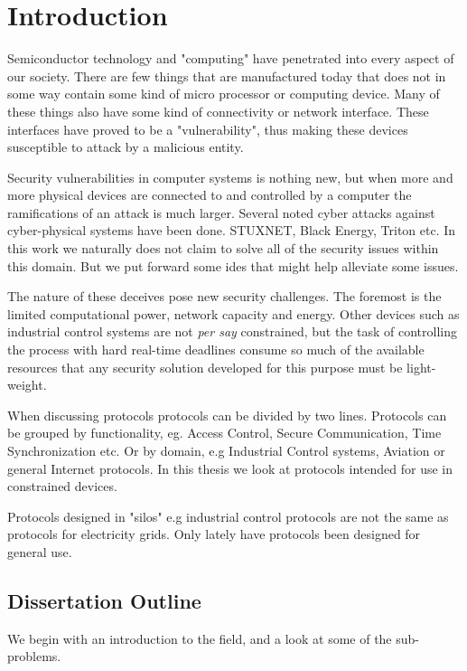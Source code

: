 \chapter{Introduction}
Semiconductor technology and "computing" have penetrated into every aspect of our society. There are few things that are manufactured today that does not in some way contain some kind of micro processor or computing device. Many of these things also have some kind of connectivity or network interface. These interfaces have proved to be a "vulnerability", thus making these devices susceptible to attack by a malicious entity.

Security vulnerabilities in computer systems is nothing new, but when more and more physical devices are connected to and controlled by a computer the ramifications of an attack is much larger.
Several noted cyber attacks against cyber-physical systems have been done. STUXNET, Black Energy, Triton etc.
In this work we naturally does not claim to solve all of the security issues within this domain. But we put forward some ides that might help alleviate some issues.

The nature of these deceives pose new security challenges. The foremost is the limited computational power, network capacity and energy. 
Other devices such as industrial control systems are not \emph{per say} constrained, but the task of controlling the process with hard real-time deadlines consume so much of the available resources that any security solution developed for this purpose must be light-weight. 

When discussing protocols protocols can be divided by two lines. Protocols can be grouped by functionality, eg. Access Control, Secure Communication, Time Synchronization etc. Or by domain, e.g Industrial Control systems, Aviation or general Internet protocols. 
In this thesis we look at protocols intended for use in constrained devices. 

Protocols designed in "silos" e.g industrial control protocols are not the same as protocols for electricity grids. 
Only lately have protocols been designed for general use. 



\section{Dissertation Outline}
We begin with an introduction to the field, and a look at some of the sub-problems.


